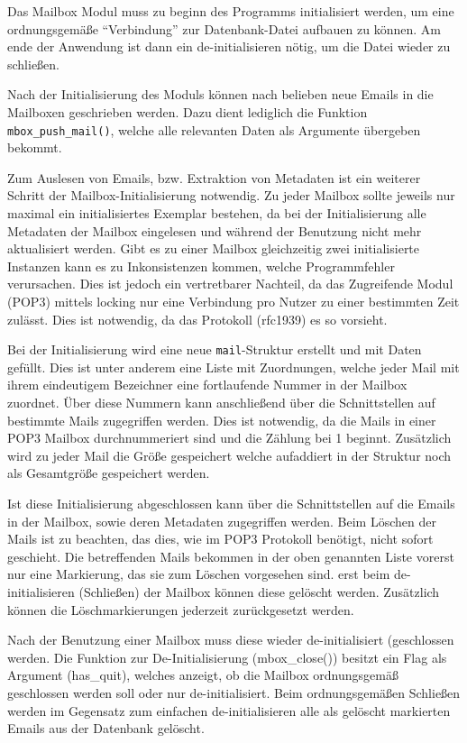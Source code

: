 \documentclass[final,a4paper,11pt,notitlepage,halfparskip]{scrreprt}
\begin{document}
Das Mailbox Modul muss zu beginn des Programms initialisiert werden, um eine
ordnungsgemäße "`Verbindung"' zur Datenbank-Datei aufbauen zu können. Am ende der
Anwendung ist dann ein de-initialisieren nötig, um die Datei wieder zu
schließen.

Nach der Initialisierung des Moduls können nach belieben neue Emails in die
Mailboxen geschrieben werden. Dazu dient lediglich die Funktion
\texttt{mbox\_push\_mail()}, welche alle relevanten Daten als Argumente
übergeben bekommt.

Zum Auslesen von Emails, bzw. Extraktion von Metadaten ist ein weiterer Schritt
der Mailbox-Initialisierung notwendig. Zu jeder Mailbox sollte jeweils nur
maximal ein initialisiertes Exemplar bestehen, da bei der Initialisierung alle
Metadaten der Mailbox eingelesen und während der Benutzung nicht mehr
aktualisiert werden. Gibt es zu einer Mailbox gleichzeitig zwei initialisierte
Instanzen kann es zu Inkonsistenzen kommen, welche Programmfehler verursachen.
Dies ist jedoch ein vertretbarer Nachteil, da das Zugreifende Modul (POP3)
mittels locking nur eine Verbindung pro Nutzer zu einer bestimmten Zeit zulässt.
Dies ist notwendig, da das Protokoll (rfc1939) es so vorsieht.

Bei der Initialisierung wird eine neue \texttt{mail}-Struktur erstellt und mit
Daten gefüllt. Dies ist unter anderem eine Liste mit Zuordnungen, welche jeder
Mail mit ihrem eindeutigem Bezeichner eine fortlaufende Nummer in der Mailbox
zuordnet. Über diese Nummern kann anschließend über die Schnittstellen auf
bestimmte Mails zugegriffen werden. Dies ist notwendig, da die Mails in einer
POP3 Mailbox durchnummeriert sind und die Zählung bei 1 beginnt. Zusätzlich wird
zu jeder Mail die Größe gespeichert welche aufaddiert in der Struktur noch als
Gesamtgröße gespeichert werden.

Ist diese Initialisierung abgeschlossen kann über die Schnittstellen auf die
Emails in der Mailbox, sowie deren Metadaten zugegriffen werden. Beim Löschen der
Mails ist zu beachten, das dies, wie im POP3 Protokoll benötigt, nicht sofort
geschieht. Die betreffenden Mails bekommen in der oben genannten Liste vorerst
nur eine Markierung, das sie zum Löschen vorgesehen sind. erst beim
de-initialisieren (Schließen) der Mailbox können diese gelöscht werden.
Zusätzlich können die Löschmarkierungen jederzeit zurückgesetzt werden.

Nach der Benutzung einer Mailbox muss diese wieder de-initialisiert (geschlossen
werden. Die Funktion zur De-Initialisierung (mbox\_close()) besitzt ein Flag als
Argument (has\_quit), welches anzeigt, ob die Mailbox ordnungsgemäß geschlossen
werden soll oder nur de-initialisiert. Beim ordnungsgemäßen Schließen werden im
Gegensatz zum einfachen de-initialisieren alle als gelöscht markierten Emails 
aus der Datenbank gelöscht.
\end{document}
